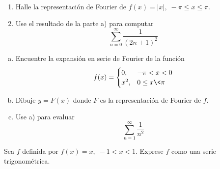 \documentclass[11pt]{article}
\begin{document}
\begin{question} %
    \begin{enumerate}[ a) ]
    \item Halle la representación de Fourier de $f(x) = |x|, \; -\pi \leq x \leq \pi$.
    \item Use el resultado de la parte a) para computar
        \[ \sum_{n = 0}^{\infty} \frac{1}{(2 n + 1)^2} \]
\end{enumerate}
\end{question}

\begin{question} %
\begin{enumerate}[a)]
\item Encuentre la expansión en serie de Fourier de la función
    \[ f(x) = 
        \begin{cases}
            0,& -\pi < x < 0 \\
            x^2,& 0 \leq x \< \pi
        \end{cases} \]
\item Dibuje $y = F(x)$ donde $F$ es la representación de Fourier de $f$.
\item Use a) para evaluar
    \[ \sum_{n = 1}^{\infty} \frac{1}{n^2} \]
\end{enumerate}
\end{question}

\begin{question} %
Sea $f$ definida por $f(x) = x, \; -1 < x < 1$. Exprese $f$ como una serie trigonométrica.
\end{question}
\end{document}
